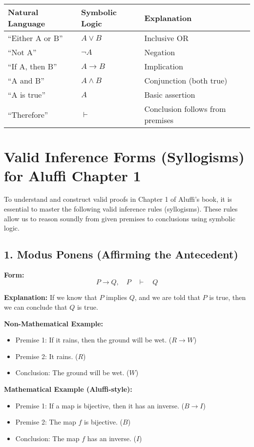 \documentclass[10pt]{article}
\theoremstyle{plain}
\theoremstyle{definition}
\begin{document}
  \begin{center}
  	\begin{tabular}{|l|l|l|}
  		\hline
  		\textbf{Natural Language} & \textbf{Symbolic Logic} & \textbf{Explanation} \\
  		\hline
  		``Either A or B'' & $A \lor B$ & Inclusive OR \\
  		``Not A'' & $\lnot A$ & Negation \\
  		``If A, then B'' & $A \rightarrow B$ & Implication \\
  		``A and B'' & $A \land B$ & Conjunction (both true) \\
  		``A is true'' & $A$ & Basic assertion \\
  		``Therefore'' & $\vdash$ & Conclusion follows from premises \\
  		\hline
  	\end{tabular}
  \end{center}
  
  \section*{Valid Inference Forms (Syllogisms) for Aluffi Chapter 1}
  
  To understand and construct valid proofs in Chapter 1 of Aluffi's book, it is essential to master the following valid inference rules (syllogisms). These rules allow us to reason soundly from given premises to conclusions using symbolic logic.
  
  \subsection*{1. Modus Ponens (Affirming the Antecedent)}
  
  \textbf{Form:}
  \[
  P \rightarrow Q,\quad P \quad \vdash \quad Q
  \]
  
  \textbf{Explanation:}  
  If we know that $P$ implies $Q$, and we are told that $P$ is true, then we can conclude that $Q$ is true.
  
  \textbf{Non-Mathematical Example:}
  \begin{itemize}
  	\item Premise 1: If it rains, then the ground will be wet. ($R \rightarrow W$)
  	\item Premise 2: It rains. ($R$)
  	\item Conclusion: The ground will be wet. ($W$)
  \end{itemize}
  
  \textbf{Mathematical Example (Aluffi-style):}
  \begin{itemize}
  	\item Premise 1: If a map is bijective, then it has an inverse. ($B \rightarrow I$)
  	\item Premise 2: The map $f$ is bijective. ($B$)
  	\item Conclusion: The map $f$ has an inverse. ($I$)
  \end{itemize}
  
\end{document}
